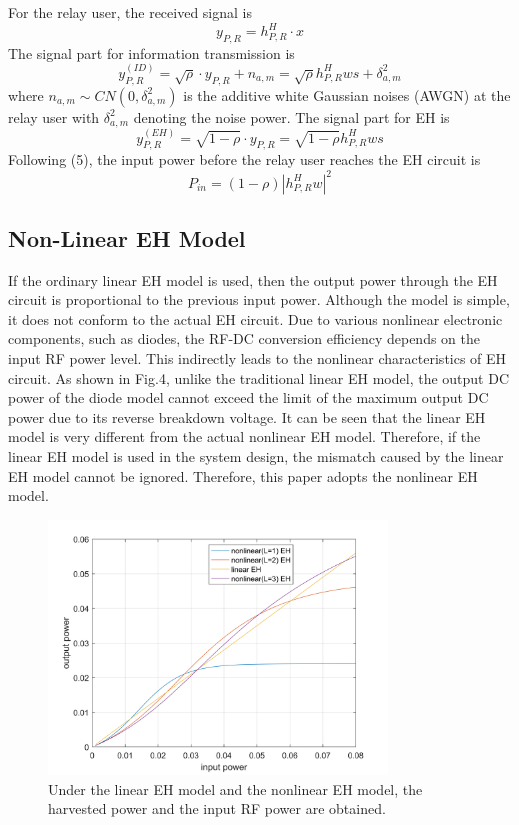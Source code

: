 \documentclass[conference]{IEEEtran}
\begin{document}
For the relay user, the received signal is
\begin{equation}\label{eqn-1} 
y_{P,R} =h_{P,R}^{H} \cdot x
\end{equation}
The signal part for information transmission is
\begin{equation}\label{eqn-1}
y_{P,R}^{(ID)} = \sqrt{\rho }\cdot y_{P,R}+  n_{a,m}= \sqrt{\rho }h_{P,R}^{H}ws+  \delta _{a,m}^{2}
\end{equation}
where $n_{a,m}\sim CN\left ( 0,\delta _{a,m}^{2}   \right )$ is the additive white Gaussian noises (AWGN) at the relay user with $\delta _{a,m}^{2} $ denoting the noise power. 
The signal part for EH is
\begin{equation}\label{eqn-1}
y_{P,R}^{(EH)} = \sqrt{1-\rho }\cdot y_{P,R} = \sqrt{1-\rho }h_{P,R}^{H}ws
\end{equation}
Following (5), the input power before the relay user reaches the EH circuit is 
\begin{equation}\label{eqn-1}
P_{in} = \left ( 1-\rho  \right ) \left | h_{P,R}^{H}w  \right | ^{2}
\end{equation}

\subsection{Non-Linear EH Model}\label{BB}

If the ordinary linear EH model is used, then the output power through the EH circuit is proportional to the previous input power. Although the model is simple, it does not conform to the actual EH circuit. Due to various nonlinear electronic components, such as diodes, the RF-DC conversion efficiency depends on the input RF power level. This indirectly leads to the nonlinear characteristics of EH circuit. As shown in Fig.4, unlike the traditional linear EH model, the output DC power of the diode model cannot exceed the limit of the maximum output DC power due to its reverse breakdown voltage. It can be seen that the linear EH model is very different from the actual nonlinear EH model. Therefore, if the linear EH model is used in the system design, the mismatch caused by the linear EH model cannot be ignored. Therefore, this paper adopts the nonlinear EH model.

\begin{figure}[htbp]
\centerline{\includegraphics[width=9cm,keepaspectratio]{4.png}}
\caption{ Under the linear EH model and the nonlinear EH model, the harvested power and the input RF power are obtained.}
\label{fig}
\end{figure}
\end{document}

